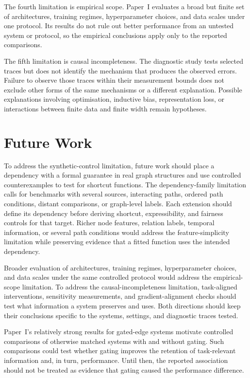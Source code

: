 The fourth limitation is empirical scope.
Paper~I evaluates a broad but finite set of architectures, training regimes, hyperparameter choices, and data scales under one protocol.
Its results do not rule out better performance from an untested system or protocol, so the empirical conclusions apply only to the reported comparisons.

The fifth limitation is causal incompleteness.
The diagnostic study tests selected traces but does not identify the mechanism that produces the observed errors.
Failure to observe those traces within their measurement bounds does not exclude other forms of the same mechanisms or a different explanation.
Possible explanations involving optimisation, inductive bias, representation loss, or interactions between finite data and finite width remain hypotheses.

\section{Future Work}

To address the synthetic-control limitation, future work should place a dependency with a formal guarantee in real graph structures and use controlled counterexamples to test for shortcut functions.
The dependency-family limitation calls for benchmarks with several sources, interacting paths, ordered path conditions, distant comparisons, or graph-level labels.
Each extension should define its dependency before deriving shortcut, expressibility, and fairness controls for that target.
Richer node features, relation labels, temporal information, or several path conditions would address the feature-simplicity limitation while preserving evidence that a fitted function uses the intended dependency.

Broader evaluation of architectures, training regimes, hyperparameter choices, and data scales under the same controlled protocol would address the empirical-scope limitation.
To address the causal-incompleteness limitation, task-aligned interventions, sensitivity measurements, and gradient-alignment checks should test what information a system preserves and uses.
Both directions should keep their conclusions specific to the systems, settings, and diagnostic traces tested.

Paper~I's relatively strong results for gated-edge systems motivate controlled comparisons of otherwise matched systems with and without gating.
Such comparisons could test whether gating improves the retention of task-relevant information and, in turn, performance.
Until then, the reported association should not be treated as evidence that gating caused the performance difference.

